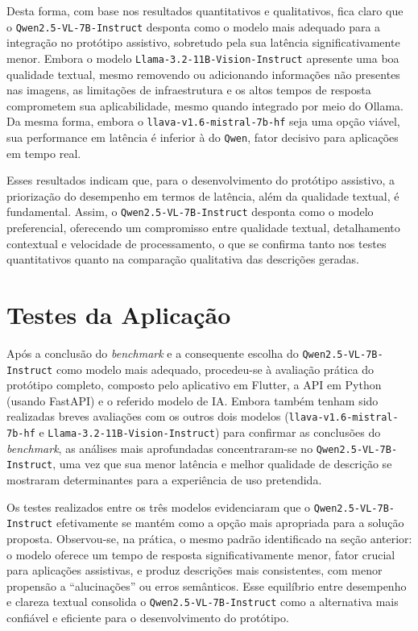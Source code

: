 Desta forma, com base nos resultados quantitativos e qualitativos, fica claro que o \texttt{Qwen2.5-VL-7B-Instruct} desponta como o modelo mais adequado para a integração no protótipo assistivo, sobretudo pela sua latência significativamente menor. Embora o modelo \texttt{Llama-3.2-11B-Vision-Instruct} apresente uma boa qualidade textual, mesmo removendo ou adicionando informações não presentes nas imagens, as limitações de infraestrutura e os altos tempos de resposta comprometem sua aplicabilidade, mesmo quando integrado por meio do Ollama. Da mesma forma, embora o \texttt{llava-v1.6-mistral-7b-hf} seja uma opção viável, sua performance em latência é inferior à do \texttt{Qwen}, fator decisivo para aplicações em tempo real.

Esses resultados indicam que, para o desenvolvimento do protótipo assistivo, a priorização do desempenho em termos de latência, além da qualidade textual, é fundamental. Assim, o \texttt{Qwen2.5-VL-7B-Instruct} desponta como o modelo preferencial, oferecendo um compromisso entre qualidade textual, detalhamento contextual e velocidade de processamento, o que se confirma tanto nos testes quantitativos quanto na comparação qualitativa das descrições geradas.

\section{Testes da Aplicação}

Após a conclusão do \textit{benchmark} e a consequente escolha do \texttt{Qwen2.5-VL-7B-Instruct} como modelo mais adequado, procedeu-se à avaliação prática do protótipo completo, composto pelo aplicativo em Flutter, a API em Python (usando FastAPI) e o referido modelo de IA. Embora também tenham sido realizadas breves avaliações com os outros dois modelos (\texttt{llava-v1.6-mistral-7b-hf} e \texttt{Llama-3.2-11B-Vision-Instruct}) para confirmar as conclusões do \textit{benchmark}, as análises mais aprofundadas concentraram-se no \texttt{Qwen2.5-VL-7B-Instruct}, uma vez que sua menor latência e melhor qualidade de descrição se mostraram determinantes para a experiência de uso pretendida.

Os testes realizados entre os três modelos evidenciaram que o \texttt{Qwen2.5-VL-7B-Instruct} efetivamente se mantém como a opção mais apropriada para a solução proposta. Observou-se, na prática, o mesmo padrão identificado na seção anterior: o modelo oferece um tempo de resposta significativamente menor, fator crucial para aplicações assistivas, e produz descrições mais consistentes, com menor propensão a “alucinações” ou erros semânticos. Esse equilíbrio entre desempenho e clareza textual consolida o \texttt{Qwen2.5-VL-7B-Instruct} como a alternativa mais confiável e eficiente para o desenvolvimento do protótipo.

